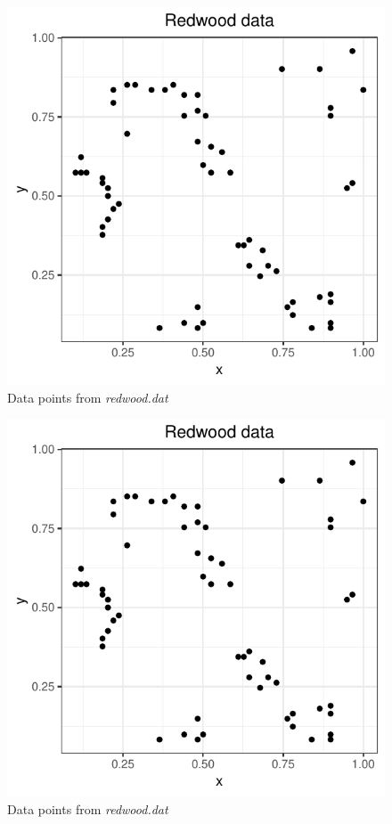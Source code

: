 \section{}
\label{sec:problem3}
\begin{figure}
    \centering
    \includegraphics[scale=0.95]{figures/prob1_redwood_points.pdf}
    \caption{Data points from \textit{redwood.dat}}
    \label{fig:redwood_points}
\end{figure}
\begin{figure}
    \centering
    \includegraphics[scale=0.95]{figures/prob1_redwood_points.pdf}
    \caption{Data points from \textit{redwood.dat}}
    \label{fig:redwood_points}
\end{figure}
